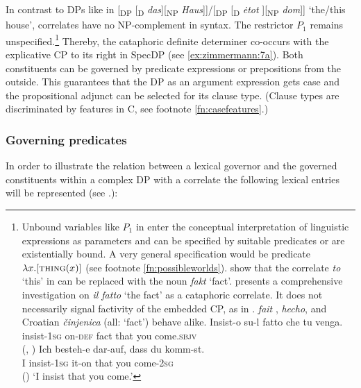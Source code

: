 \documentclass[output=paper]{langscibook}
\begin{document}
In contrast to DPs like in [\textsubscript{DP} [\textsubscript{D} \textit{das}][\textsubscript{NP} \textit{Haus}]]/[\textsubscript{DP} [\textsubscript{D} \textit{ėtot} ][\textsubscript{NP} \textit{dom}]] `the/this house', correlates have no NP-complement in syntax. The restrictor $P_1$ remains unspecified.\footnote{Unbound variables like $P_1$ in  enter the conceptual interpretation of linguistic expressions as parameters and can be specified by suitable predicates or are existentially bound. A very general specification would be  predicate $\lambda x.[\textsc{thing} (x)]$ (see footnote \ref{fn:possibleworlds}). \citet[67]{BondarukRozwadowskaWitkowski2017} show that the correlate \textit{to} `this' in  can be replaced with the noun \textit{fakt} `fact'. \citet[2.4]{Mollica2010} presents a comprehensive investigation on  \textit{il fatto} `the fact' as a cataphoric correlate. It does not necessarily signal factivity of the embedded CP, as in .  \textit{fait} ,  \textit{hecho}, and Croatian \textit{činjenica} (all: `fact') behave alike.
        \ea\label{ex:zimmermann:Italian1}
        \ea\gll Insist-o su-l fatto che tu venga.\\
        insist-\textsc{1sg} on-\textsc{def} fact that you come.\textsc{sbjv}\\ \hfill (, \citealt[240]{Mollica2010})
        \ex
        \gll Ich besteh-e dar-auf, dass du komm-st.\\
        I insist-\textsc{1sg} {it-on} that you come-\textsc{2sg}\\ \hfill ()
        \z
        \glt `I insist that you come.'
        \z
} Thereby, the cataphoric definite determiner co-occurs with the explicative CP to its right in SpecDP (see \ref{ex:zimmermann:7a}). Both constituents can be governed by predicate expressions or prepositions from the outside. This guarantees that the DP as an argument expression gets case and the propositional adjunct can be selected for its clause type. (Clause types are discriminated by features in C, see footnote \ref{fn:casefeatures}.)


\subsubsection{Governing predicates}\label{s:2.3.2}

In order to illustrate the relation between a lexical governor and the governed constituents within a complex DP with a correlate the following lexical entries will be represented (see \citet[42--45]{Zimmermann2016a}.):
\end{document}
